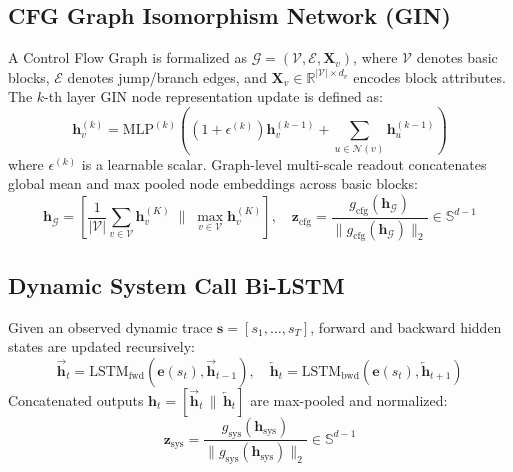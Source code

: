 \documentclass[pdflatex,sn-mathphys-num]{sn-jnl}
\begin{document}
\subsection{CFG Graph Isomorphism Network (GIN)}\label{sec:math_gin}
A Control Flow Graph is formalized as $\mathcal{G} = (\mathcal{V}, \mathcal{E}, \mathbf{X}_v)$, where $\mathcal{V}$ denotes basic blocks, $\mathcal{E}$ denotes jump/branch edges, and $\mathbf{X}_v \in \mathbb{R}^{|\mathcal{V}| \times d_v}$ encodes block attributes. The $k$-th layer GIN node representation update is defined as:
\begin{equation}
\mathbf{h}_v^{(k)} = \text{MLP}^{(k)}\left(\left(1 + \epsilon^{(k)}\right)\mathbf{h}_v^{(k-1)} + \sum_{u \in \mathcal{N}(v)} \mathbf{h}_u^{(k-1)}\right)
\end{equation}
where $\epsilon^{(k)}$ is a learnable scalar. Graph-level multi-scale readout concatenates global mean and max pooled node embeddings across basic blocks:
\begin{equation}
\mathbf{h}_{\mathcal{G}} = \left[\frac{1}{|\mathcal{V}|} \sum_{v \in \mathcal{V}} \mathbf{h}_v^{(K)} \;\Bigg\|\; \max_{v \in \mathcal{V}} \mathbf{h}_v^{(K)}\right], \quad \mathbf{z}_{\text{cfg}} = \frac{g_{\text{cfg}}(\mathbf{h}_{\mathcal{G}})}{\|g_{\text{cfg}}(\mathbf{h}_{\mathcal{G}})\|_2} \in \mathbb{S}^{d-1}
\end{equation}

\subsection{Dynamic System Call Bi-LSTM}\label{sec:math_syscall}
Given an observed dynamic trace $\mathbf{s} = [s_1, \dots, s_T]$, forward and backward hidden states are updated recursively:
\begin{equation}
\overrightarrow{\mathbf{h}}_t = \text{LSTM}_{\text{fwd}}(\mathbf{e}(s_t), \overrightarrow{\mathbf{h}}_{t-1}), \quad \overleftarrow{\mathbf{h}}_t = \text{LSTM}_{\text{bwd}}(\mathbf{e}(s_t), \overleftarrow{\mathbf{h}}_{t+1})
\end{equation}
Concatenated outputs $\mathbf{h}_t = [\overrightarrow{\mathbf{h}}_t \,\|\, \overleftarrow{\mathbf{h}}_t]$ are max-pooled and normalized:
\begin{equation}
\mathbf{z}_{\text{sys}} = \frac{g_{\text{sys}}(\mathbf{h}_{\text{sys}})}{\|g_{\text{sys}}(\mathbf{h}_{\text{sys}})\|_2} \in \mathbb{S}^{d-1}
\end{equation}
\end{document}
